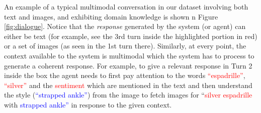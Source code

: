 \documentclass[letterpaper]{article} %
\begin{document}


An example of a typical multimodal conversation in our dataset involving both text and images, and exhibiting domain knowledge is shown n Figure \ref{fig:dialogue}. Notice that the \textit{response} generated by the system (or agent) can either be text (for example, see the 3rd turn inside the highlighted portion in red) or a set of images (as seen in the 1st turn there). Similarly, at every point, the context available to the system is multimodal which the system has to process to generate a coherent response. For example, to give a relevant response in Turn 2 inside the box the agent needs to first pay attention to the words \textcolor{red}{``espadrille''}, \textcolor{red}{``silver''} and the \textcolor{red}{sentiment} which are mentioned in the text and then understand the style (\textcolor{blue}{``strapped ankle''}) from the image to fetch images for ``\textcolor{red}{silver espadrille} with \textcolor{blue}{strapped ankle''} in response to the given context.
\end{document}

